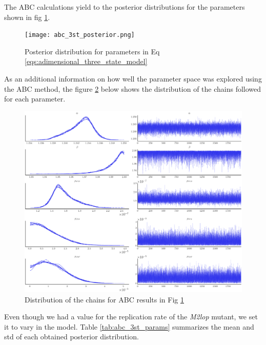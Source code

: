 \documentclass[10pt,a4paper]{scrartcl}
\begin{document}
The ABC calculations yield to the posterior distributions for the parameters shown in fig \ref{fig:posterior_abc_3st}.

\begin{figure}[H]
    \centering
    \texttt{[image: abc\_3st\_posterior.png]}
    \caption{Posterior distribution for parameters in Eq \ref{eqs:adimensional_three_state_model}}
    \label{fig:posterior_abc_3st}
\end{figure}

As an additional information on how well the parameter space was explored using the ABC method, the figure \ref{fig:abc_3st_param_chains} below shows the distribution of the chains followed for each parameter.

\begin{figure}[H]
    \centering
    \includegraphics[width=1\linewidth]{plots/abc_3st_param_dist.png}
    \caption{Distribution of the chains for ABC results in Fig \ref{fig:posterior_abc_3st}}
    \label{fig:abc_3st_param_chains}
\end{figure}

Even though we had a value for the replication rate of the \textit{M2lop} mutant, we set it to vary in the model. Table \ref{tab:abc_3st_params} summarizes the mean and std of each obtained posterior distribution.
\end{document}
